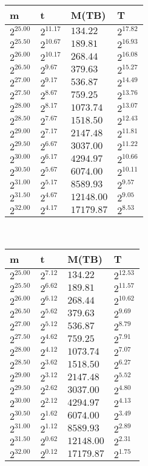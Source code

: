 \begin{tabular}{llll}
m & t & M(TB) & T \\ \hline
$2^{25.00}$ & $2^{11.17}$ & $134.22$ & $2^{17.82}$ \\
$2^{25.50}$ & $2^{10.67}$ & $189.81$ & $2^{16.93}$ \\
$2^{26.00}$ & $2^{10.17}$ & $268.44$ & $2^{16.08}$ \\
$2^{26.50}$ & $2^{9.67}$ & $379.63$ & $2^{15.27}$ \\
$2^{27.00}$ & $2^{9.17}$ & $536.87$ & $2^{14.49}$ \\
$2^{27.50}$ & $2^{8.67}$ & $759.25$ & $2^{13.76}$ \\
$2^{28.00}$ & $2^{8.17}$ & $1073.74$ & $2^{13.07}$ \\
$2^{28.50}$ & $2^{7.67}$ & $1518.50$ & $2^{12.43}$ \\
$2^{29.00}$ & $2^{7.17}$ & $2147.48$ & $2^{11.81}$ \\
$2^{29.50}$ & $2^{6.67}$ & $3037.00$ & $2^{11.22}$ \\
$2^{30.00}$ & $2^{6.17}$ & $4294.97$ & $2^{10.66}$ \\
$2^{30.50}$ & $2^{5.67}$ & $6074.00$ & $2^{10.11}$ \\
$2^{31.00}$ & $2^{5.17}$ & $8589.93$ & $2^{9.57}$ \\
$2^{31.50}$ & $2^{4.67}$ & $12148.00$ & $2^{9.05}$ \\
$2^{32.00}$ & $2^{4.17}$ & $17179.87$ & $2^{8.53}$ \\
\end{tabular}
 \ 
\begin{tabular}{llll}
m & t & M(TB) & T \\ \hline
$2^{25.00}$ & $2^{7.12}$ & $134.22$ & $2^{12.53}$ \\
$2^{25.50}$ & $2^{6.62}$ & $189.81$ & $2^{11.57}$ \\
$2^{26.00}$ & $2^{6.12}$ & $268.44$ & $2^{10.62}$ \\
$2^{26.50}$ & $2^{5.62}$ & $379.63$ & $2^{9.69}$ \\
$2^{27.00}$ & $2^{5.12}$ & $536.87$ & $2^{8.79}$ \\
$2^{27.50}$ & $2^{4.62}$ & $759.25$ & $2^{7.91}$ \\
$2^{28.00}$ & $2^{4.12}$ & $1073.74$ & $2^{7.07}$ \\
$2^{28.50}$ & $2^{3.62}$ & $1518.50$ & $2^{6.27}$ \\
$2^{29.00}$ & $2^{3.12}$ & $2147.48$ & $2^{5.52}$ \\
$2^{29.50}$ & $2^{2.62}$ & $3037.00$ & $2^{4.80}$ \\
$2^{30.00}$ & $2^{2.12}$ & $4294.97$ & $2^{4.13}$ \\
$2^{30.50}$ & $2^{1.62}$ & $6074.00$ & $2^{3.49}$ \\
$2^{31.00}$ & $2^{1.12}$ & $8589.93$ & $2^{2.89}$ \\
$2^{31.50}$ & $2^{0.62}$ & $12148.00$ & $2^{2.31}$ \\
$2^{32.00}$ & $2^{0.12}$ & $17179.87$ & $2^{1.75}$ \\
\end{tabular}
